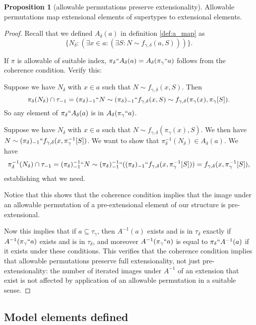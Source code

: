 \documentclass[112pt]{article}
\theoremstyle{definition}
\newtheorem{proposition}[theorem]{Proposition}
\theoremstyle{remark}
\newcommand{\rk}[1]{{\color{blue}\sl #1}}
\begin{document}
\begin{proposition}[allowable permutations preserve extensionality]\label{prop:allowable_preserves_extensionality}
Allowable permutations map extensional elements of supertypes to extensional elements.
\end{proposition}
\begin{proof}
{Recall that} we defined $A_\delta(a)$ {in definition \ref{def:a_map}} as $$\{N_\delta:(\exists x \in a:(\exists S:N \sim f_{\gamma,\delta}(a,S)))\}.$$

If $\pi$ is allowable of suitable index, $\pi_\delta``A_\delta(a)= A_\delta(\pi_\gamma``a)$ follows from the coherence condition.  Verify this:

Suppose we have $N_\delta$ with $x \in a$ such that $N \sim f_{\gamma,\delta}(x,S)$.  Then $$\pi_\delta(N_\delta)  \cap \tau_{-1} = (\pi_\delta)_{-1}``N \sim (\pi_\delta)_{-1}``f_{\gamma,\delta}(x,S) \sim f_{\gamma,\delta}(\pi_\gamma(x),\pi_\gamma[S]).$$  So any element of $\pi_\delta``A_\delta(a)$ is in $A_\delta(\pi_\gamma``a)$.

Suppose we have $N_\delta$ with $x \in a$ such that $N \sim f_{\gamma,\delta}(\pi_\gamma(x),S)$.  We then have $N \sim (\pi_\delta)_{-1}``f_{\gamma,\delta}(x,\pi_\gamma^{-1}[S])$.  We want to show that $\pi_\delta^{-1}(N_\delta) \in A_\delta(a)$.  We have $$\pi_\delta^{-1}(N_\delta) \cap \tau_{-1} = (\pi_\delta)_{-1}^{-1}``N \sim
(\pi_\delta)_{-1}^{-1}``((\pi_\delta)_{-1}``f_{\gamma,\delta}(x,\pi_\gamma^{-1}[S])) = f_{\gamma,\delta}(x,\pi_\gamma^{-1}[S]),$$ establishing what we need.

Notice that this shows that the coherence condition implies that the image under an allowable permutation of a pre-extensional element of our structure is pre-extensional.

Now this implies that if $a \subseteq \tau_\gamma$, then $A^{-1}(a)$ exists and is in $\tau_\delta$ exactly if $A^{-1}(\pi_\gamma``a)$ exists and is in $\tau_\delta$, and moreover $A^{-1}(\pi_\gamma``a)$ is equal to $\pi_\delta``A^{-1}(a)$ if it exists under these conditions.  This verifies that the coherence condition implies that allowable permutations preserve full extensionality, not just pre-extensionality:  the number of iterated images under $A^{-1}$ of an extension that exist is not affected by application of an allowable permutation in a suitable sense.
\end{proof}

\subsection{Model elements defined}\label{ss:model_elements}
\end{document}
